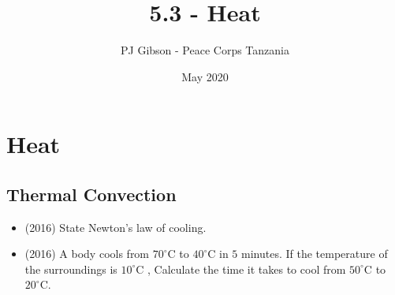 \documentclass{article}
\title{5.3 - Heat}
\author{PJ Gibson - Peace Corps Tanzania}
\date{May 2020}
\begin{document}
\maketitle


\section{Heat}

\subsection{Thermal Convection}
\begin{itemize}
\item (2016)  State Newton’s law of cooling. 
\item (2016)  A body cools from $ 70^{\circ}$C to $ 40^{\circ}$C in $ 5$ minutes. If the temperature of the surroundings is $ 10^{\circ}$C , Calculate the time it takes to cool from $ 50^{\circ}$C to $ 20^{\circ}$C.  
\end{itemize}
\end{document}
